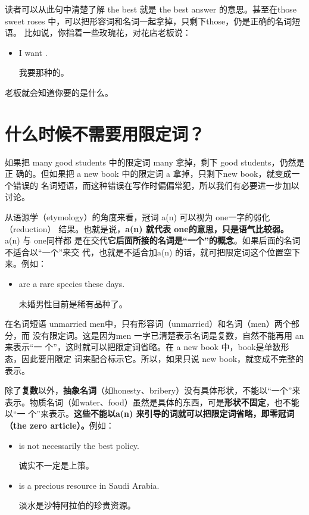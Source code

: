 读者可以从此句中清楚了解 the best 就是 the best answer 的意思。甚至在those
sweet roses 中，可以把形容词和名词一起拿掉，只剩下those，仍是正确的名词短语。
比如说，你指着一些玫瑰花，对花店老板说：
\begin{itemize}
\item I want .

  我要那种的。
\end{itemize}

老板就会知道你要的是什么。

\section{什么时候不需要用限定词？}

如果把 many good students 中的限定词 many 拿掉，剩下 good students，仍然是正
确的。但如果把 a new book 中的限定词 a 拿掉，只剩下new book，就变成一个错误的
名词短语，而这种错误在写作时偏偏常犯，所以我们有必要进一步加以讨论。

从语源学（etymology）的角度来看，冠词 a(n) 可以视为 one一字的弱化（reduction）
结果。也就是说，\textbf{a(n) 就代表 one的意思，只是语气比较弱。} a(n) 与 one同样都
是在交代\textbf{它后面所接的名词是“一个”的概念}。如果后面的名词不适合以“一个”来交
代，也就是不适合加a(n) 的话，就可把限定词这个位置空下来。例如：
\begin{itemize}
\item {} are a rare species these days.

  未婚男性目前是稀有品种了。
\end{itemize}

在名词短语 unmarried men中，只有形容词（unmarried）和名词（men）两个部分，而
没有限定词。这是因为men 一字已清楚表示名词是复数，自然不能再用 an来表示“一
个”，这时就可以把限定词省略。在 a new book 中，book是单数形态，因此要用限定
词来配合标示它。所以，如果只说 new book，就变成不完整的表示。

除了\textbf{复数}以外，\textbf{抽象名词}（如honesty、bribery）没有具体形状，不能以“一个”来
表示。物质名词（如water、food）虽然是具体的东西，可是\textbf{形状不固定}，也不能以“一
个”来表示。\textbf{这些不能以a(n) 来引导的词就可以把限定词省略，即零冠词（the
  zero article）。}例如：

\begin{itemize}
\item  {} is not necessarily the best policy.

  诚实不一定是上策。

\item  {} is a precious resource in Saudi Arabia.

  淡水是沙特阿拉伯的珍贵资源。
\end{itemize}

